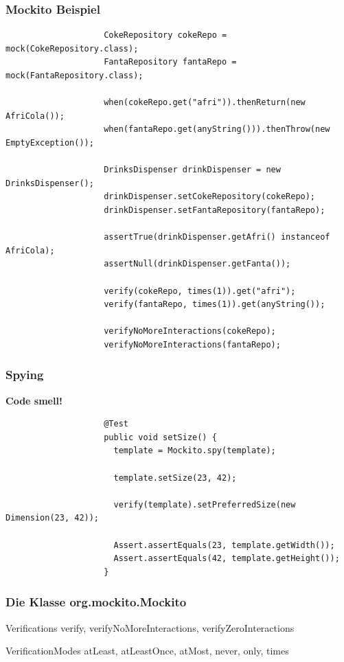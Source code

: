 \documentclass{beamer}
\begin{document}
			\begin{frame}[fragile]
				\frametitle{Mockito Beispiel}

				\begin{lstlisting}
					CokeRepository cokeRepo = mock(CokeRepository.class);
					FantaRepository fantaRepo = mock(FantaRepository.class);

					when(cokeRepo.get("afri")).thenReturn(new AfriCola());
					when(fantaRepo.get(anyString())).thenThrow(new EmptyException());

					DrinksDispenser drinkDispenser = new DrinksDispenser();
					drinkDispenser.setCokeRepository(cokeRepo);
					drinkDispenser.setFantaRepository(fantaRepo);

					assertTrue(drinkDispenser.getAfri() instanceof AfriCola);
					assertNull(drinkDispenser.getFanta());

					verify(cokeRepo, times(1)).get("afri");
					verify(fantaRepo, times(1)).get(anyString());

					verifyNoMoreInteractions(cokeRepo);
					verifyNoMoreInteractions(fantaRepo);
				\end{lstlisting}
			\end{frame}

			\begin{frame}[fragile]
				\frametitle{Spying}

				\color{red}\textbf{Code smell!}
				\color{black}
				\begin{lstlisting}
					@Test
					public void setSize() {
					  template = Mockito.spy(template);

					  template.setSize(23, 42);

					  verify(template).setPreferredSize(new Dimension(23, 42));

					  Assert.assertEquals(23, template.getWidth());
					  Assert.assertEquals(42, template.getHeight());
					}
				\end{lstlisting}
			\end{frame}

			\begin{frame}
				\frametitle{Die Klasse org.mockito.Mockito}

				\begin{block}{Verifications}
					verify, verifyNoMoreInteractions, verifyZeroInteractions
				\end{block}

				\begin{block}{VerificationModes}
					atLeast, atLeastOnce, atMost, never, only, times
				\end{block}
			\end{frame}
\end{document}
